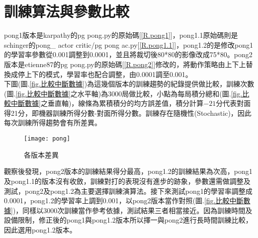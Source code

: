 \section{訓練算法與參數比較}
 pong1版本是karpathy的pg\- pong.py的原始碼[\ref{R.pong1}]，pong1.1原始碼則是schinger的pong\_ actor\- critic/pg\- pong\- ac.py[\ref{R.pong1.1}]，pong1.2的是修改pong1的學習率參數從0.001調整到0.0001，並且將裁切後80*80的影像改成75*80。pong2版本是etienne87的pg\- pong.py的原始碼[\ref{R.pong2}]修改的，將動作策略由上下上替換成停上下的模式，學習率也配合調整，由0.0001調至0.001。\\
 
 下圖(圖.\ref{fig.比較中斷數據})為這幾個版本的訓練趨勢的紀錄提供做比較，訓練次數(圖.\ref{fig.比較中斷數據}之水平軸)為3000局做比較，小點為每局積分總和(圖.\ref{fig.比較中斷數據}之垂直軸)，線條為累積積分的均方誤差值，積分計算$-21$分代表對面得21分，即機器訓練所得分數-對面所得分數。訓練存在隨機性(Stochastic)，因此每次訓練所得趨勢會有所差異。\\
\begin{table}[hbt!]
\center\large
{}
\caption{\Large 版本標示}
\end{table}

\begin{figure}[hbt!]
\begin{center}
\texttt{[image: pong]}
\caption{\Large 各版本差異}
\label{fig.各版本差異}
\end{center}
\end{figure}
觀察後發現，pong2版本的訓練結果得分最高，pong1.2的訓練結果為次高，pong1及pong1.1的版本沒有收斂，訓練對打的表現沒有進步的跡象，參數還需做調整及測試，pong2及pong1.2為主要選擇訓練演算法。接下來測試pong1的學習率調整成0.0001，pong1.2的學習率上調到0.001，以pong2版本當作對照(圖.\ref{fig.比較中斷數據})，同樣以3000次訓練當作參考依據，測試結果三者相當接近。因為訓練時間及設備限制，修正後的pong1與pong1.2版本所以擇一與pong2進行長時間訓練比較，因此選用pong1.2版本。

